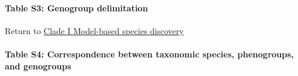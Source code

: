 \documentclass[
  11pt,
]{article}
\begin{document}
\hypertarget{table-s3-genogroup-delimitation}{%
\paragraph{Table S3: Genogroup delimitation}\label{table-s3-genogroup-delimitation}}

\begin{table}[H]

\caption{\label{tab:cladeIbfdTable}Genomic modeling for genogroup delimitation and model selection using Bayes factors (BF)}
\centering
{}
\end{table}

Return to \protect\hyperlink{model-based-species-discovery-1}{Clade I Model-based species discovery}
\pagebreak

\hypertarget{table-s4-correspondence-between-taxonomic-species-phenogroups-and-genogroups}{%
\paragraph{Table S4: Correspondence between taxonomic species, phenogroups, and genogroups}\label{table-s4-correspondence-between-taxonomic-species-phenogroups-and-genogroups}}
\end{document}
